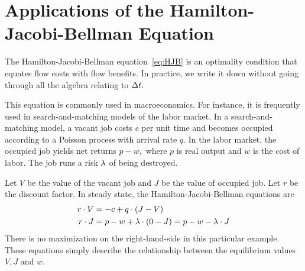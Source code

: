 \documentclass[letterpaper,12pt,leqno]{article}
\begin{document}
\section{Applications of the Hamilton-Jacobi-Bellman Equation}

The Hamilton-Jacobi-Bellman equation~\eqref{eq:HJB} is an optimality condition that equates flow costs with flow benefits. In practice, we write it down without going through all the algebra relating to $\Delta t.$ 

This equation is commonly used in macroeconomics. For instance, it is frequently used in search-and-matching models of the labor market. In a search-and-matching model, a vacant job costs $c$ per unit time and becomes occupied according to a Poisson process with arrival rate $q.$ In the labor market, the occupied job yields net returns $p-w,$ where $p$ is real output and $w$ is the cost of labor. The job runs a risk $\lambda $ of being destroyed. 

Let $V$ be the value of the vacant job and $J$ be the value of occupied job. Let $r$ be the discount factor. In steady state, the Hamilton-Jacobi-Bellman equations are
\begin{align*}
r\cdot V &=-c+q \cdot  \left( J-V \right) \\
r\cdot J &=p-w+ \lambda \cdot \left( 0-J \right)=p-w-\lambda \cdot J
\end{align*}
There is no maximization on the right-hand-side in this particular example. These equations simply describe the relationship between the equilibrium values $V,J$ and $w$. 
\end{document}
